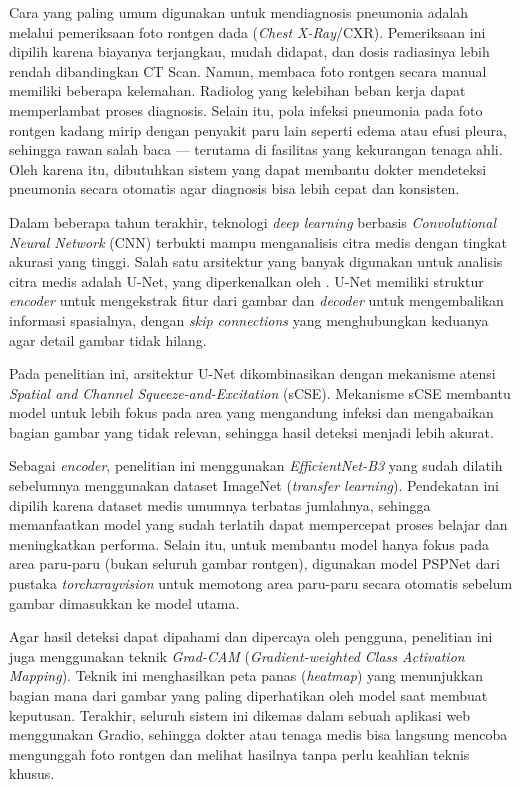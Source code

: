 \documentclass[12pt,a4paper,oneside]{book}
\begin{document}
Cara yang paling umum digunakan untuk mendiagnosis pneumonia adalah melalui pemeriksaan foto rontgen dada (\textit{Chest X-Ray}/CXR). Pemeriksaan ini dipilih karena biayanya terjangkau, mudah didapat, dan dosis radiasinya lebih rendah dibandingkan CT Scan. Namun, membaca foto rontgen secara manual memiliki beberapa kelemahan. Radiolog yang kelebihan beban kerja dapat memperlambat proses diagnosis. Selain itu, pola infeksi pneumonia pada foto rontgen kadang mirip dengan penyakit paru lain seperti edema atau efusi pleura, sehingga rawan salah baca — terutama di fasilitas yang kekurangan tenaga ahli. Oleh karena itu, dibutuhkan sistem yang dapat membantu dokter mendeteksi pneumonia secara otomatis agar diagnosis bisa lebih cepat dan konsisten.

Dalam beberapa tahun terakhir, teknologi \textit{deep learning} berbasis \textit{Convolutional Neural Network} (CNN) terbukti mampu menganalisis citra medis dengan tingkat akurasi yang tinggi. Salah satu arsitektur yang banyak digunakan untuk analisis citra medis adalah U-Net, yang diperkenalkan oleh \textcite{ronneberger2015unet}. U-Net memiliki struktur \textit{encoder} untuk mengekstrak fitur dari gambar dan \textit{decoder} untuk mengembalikan informasi spasialnya, dengan \textit{skip connections} yang menghubungkan keduanya agar detail gambar tidak hilang.

Pada penelitian ini, arsitektur U-Net dikombinasikan dengan mekanisme atensi \textit{Spatial and Channel Squeeze-and-Excitation} (sCSE). Mekanisme sCSE membantu model untuk lebih fokus pada area yang mengandung infeksi dan mengabaikan bagian gambar yang tidak relevan, sehingga hasil deteksi menjadi lebih akurat.

Sebagai \textit{encoder}, penelitian ini menggunakan \textit{EfficientNet-B3} yang sudah dilatih sebelumnya menggunakan dataset ImageNet (\textit{transfer learning}). Pendekatan ini dipilih karena dataset medis umumnya terbatas jumlahnya, sehingga memanfaatkan model yang sudah terlatih dapat mempercepat proses belajar dan meningkatkan performa. Selain itu, untuk membantu model hanya fokus pada area paru-paru (bukan seluruh gambar rontgen), digunakan model PSPNet dari pustaka \textit{torchxrayvision} untuk memotong area paru-paru secara otomatis sebelum gambar dimasukkan ke model utama.

Agar hasil deteksi dapat dipahami dan dipercaya oleh pengguna, penelitian ini juga menggunakan teknik \textit{Grad-CAM} (\textit{Gradient-weighted Class Activation Mapping}). Teknik ini menghasilkan peta panas (\textit{heatmap}) yang menunjukkan bagian mana dari gambar yang paling diperhatikan oleh model saat membuat keputusan. Terakhir, seluruh sistem ini dikemas dalam sebuah aplikasi web menggunakan Gradio, sehingga dokter atau tenaga medis bisa langsung mencoba mengunggah foto rontgen dan melihat hasilnya tanpa perlu keahlian teknis khusus.
\end{document}
